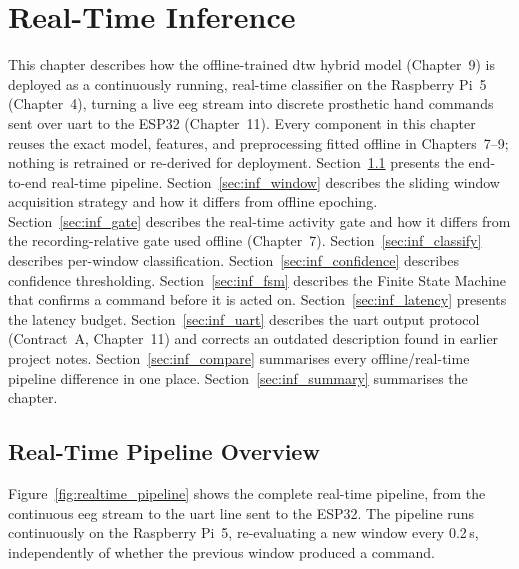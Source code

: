 \chapter{Real-Time Inference}
\label{ch:inference}

This chapter describes how the offline-trained \acrshort{dtw}
hybrid model (Chapter~9) is deployed as a continuously running,
real-time classifier on the Raspberry Pi~5 (Chapter~4), turning a
live \acrshort{eeg} stream into discrete prosthetic hand commands
sent over \acrshort{uart} to the ESP32 (Chapter~11). Every
component in this chapter reuses the exact model, features, and
preprocessing fitted offline in Chapters~7--9; nothing is retrained
or re-derived for deployment. Section~\ref{sec:inf_overview}
presents the end-to-end real-time pipeline. Section~\ref{sec:inf_window}
describes the sliding window acquisition strategy and how it
differs from offline epoching. Section~\ref{sec:inf_gate}
describes the real-time activity gate and how it differs from the
recording-relative gate used offline (Chapter~7).
Section~\ref{sec:inf_classify} describes per-window classification.
Section~\ref{sec:inf_confidence} describes confidence thresholding.
Section~\ref{sec:inf_fsm} describes the Finite State Machine that
confirms a command before it is acted on.
Section~\ref{sec:inf_latency} presents the latency budget.
Section~\ref{sec:inf_uart} describes the \acrshort{uart} output
protocol (Contract~A, Chapter~11) and corrects an outdated
description found in earlier project notes.
Section~\ref{sec:inf_compare} summarises every offline/real-time
pipeline difference in one place. Section~\ref{sec:inf_summary}
summarises the chapter.

\section{Real-Time Pipeline Overview}
\label{sec:inf_overview}

Figure~\ref{fig:realtime_pipeline} shows the complete real-time
pipeline, from the continuous \acrshort{eeg} stream to the
\acrshort{uart} line sent to the ESP32. The pipeline runs
continuously on the Raspberry Pi~5, re-evaluating a new window
every 0.2\,s, independently of whether the previous window produced
a command.


